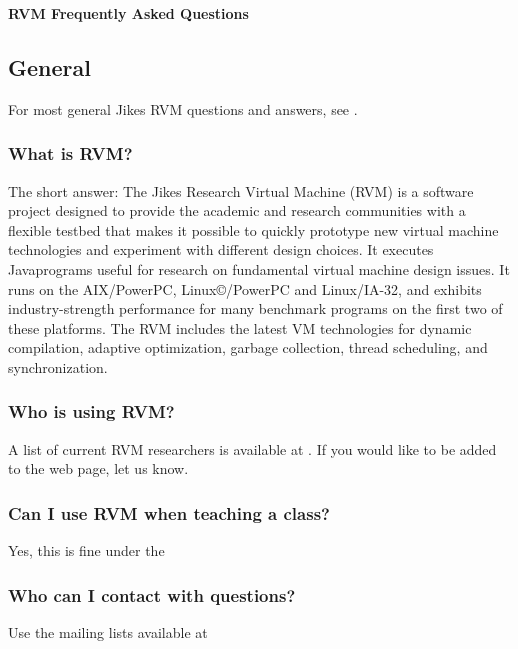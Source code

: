 \begin{center}
{\bf RVM Frequently Asked Questions}
\end{center}

\subsection{General}

For most general Jikes RVM questions and answers, see
\xlink{{\tt \QandAURL}}{\QandAURL}.

\subsubsection{What is RVM?}

The short answer:
The Jikes Research Virtual Machine (RVM) is a software project
designed to provide the academic and research communities with a
flexible testbed that makes it possible to quickly prototype new
virtual machine technologies and experiment with different design
choices. It executes Java\JavaTMFootnote programs useful for research on
fundamental virtual machine design issues.
It runs on the AIX\AIXTMFootnote/PowerPC\PowerPCTMFootnote,
Linux\copyright/PowerPC and Linux/IA-32, 
and exhibits industry-strength performance for many benchmark programs
on the first two of these platforms.  The RVM includes the latest VM
technologies for dynamic compilation, adaptive optimization, garbage
collection, thread scheduling, and synchronization.

\subsubsection{Who is using RVM?}
A list of current RVM researchers is available at
\xlink{{\tt \RVMUserListURL}}{\RVMUserListURL}.  If you would like to 
be added to the web page, let us know.

\subsubsection{Can I use RVM when teaching a class?}

Yes, this is fine under the

\subsubsection{Who can I contact with questions?}

Use the mailing lists available at 
\xlink{{\tt \RVMDownloadURL}}{\RVMDownloadURL}

